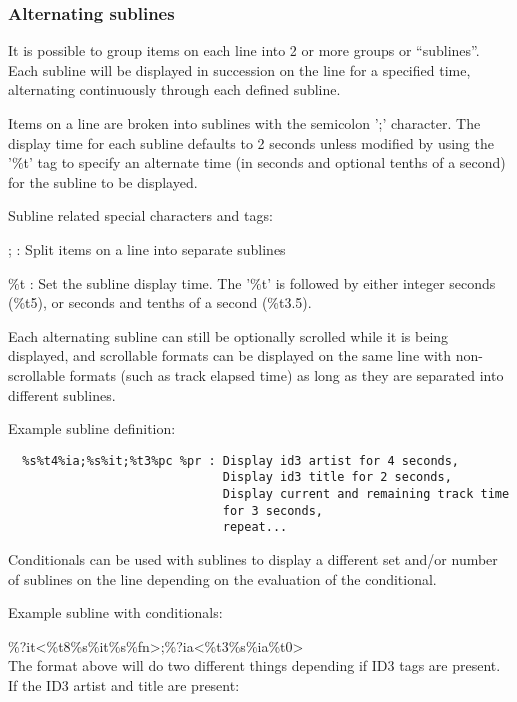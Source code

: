 \subsubsection{Alternating sublines}

It is possible to group items on each line into 2 or more groups or
``sublines''. Each subline will be displayed
in succession on the line for a specified time, alternating
continuously through each defined subline. 

Items on a line are broken into sublines with the semicolon
';' character. The display time for
each subline defaults to 2 seconds unless modified by using the
'\%t' tag to specify an alternate
time (in seconds and optional tenths of a second) for the subline to be
displayed. 

Subline related special characters and tags: 

;  : Split items on a line into separate sublines

\%t  : Set the subline display time. The
'\%t' is followed by either integer
seconds (\%t5), or seconds and tenths of a second (\%t3.5).

Each alternating subline can still be optionally scrolled while it is
being displayed, and scrollable formats can be displayed on the same
line with non{}-scrollable formats (such as track elapsed time) as long
as they are separated into different sublines.

Example subline definition:

\begin{verbatim}
  %s%t4%ia;%s%it;%t3%pc %pr : Display id3 artist for 4 seconds,
                              Display id3 title for 2 seconds,
                              Display current and remaining track time
                              for 3 seconds,
                              repeat...
\end{verbatim}

Conditionals can be used with sublines to display a different set and/or number of sublines on the line depending on the evaluation of the conditional.

Example subline with conditionals:

\%?it{\textless}\%t8\%s\%it{\textbar}\%s\%fn{\textgreater};\%?ia{\textless}\%t3\%s\%ia{\textbar}\%t0{\textgreater}\\

The format above will do two different things depending if ID3 tags are present. If the ID3 artist and title are present:


